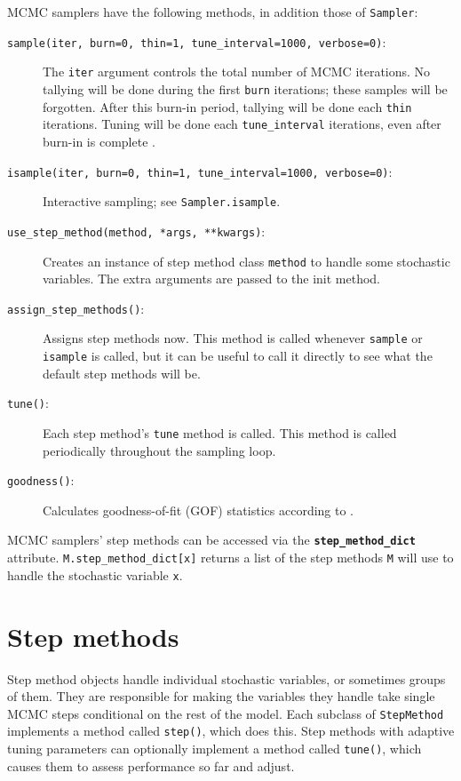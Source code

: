 MCMC samplers have the following methods, in addition those of \texttt{Sampler}:
\begin{description}
    \item[\texttt{sample(iter, burn=0, thin=1, tune\_interval=1000, verbose=0)}:] The \texttt{iter} argument controls the total number of MCMC iterations. No tallying will be done during the first \texttt{burn} iterations; these samples will be forgotten. After this burn-in period, tallying will be done each \texttt{thin} iterations. Tuning will be done each \texttt{tune\_interval} iterations, even after burn-in is complete \cite{Haario:2001lr}.
    \item[\texttt{isample(iter, burn=0, thin=1, tune\_interval=1000, verbose=0)}:] Interactive sampling; see \texttt{Sampler.isample}.
    \item[\texttt{use_step_method(method, *args, **kwargs)}:] Creates an instance of step method class \texttt{method} to handle some stochastic variables. The extra arguments are passed to the init method.
    \item[\texttt{assign_step_methods()}:] Assigns step methods now. This method is called whenever \texttt{sample} or \texttt{isample} is called, but it can be useful to call it directly to see what the default step methods will be.
    \item[\texttt{tune()}:] Each step method's \texttt{tune} method is called. This method is called periodically throughout the sampling loop.
    \item[\texttt{goodness()}:] Calculates goodness-of-fit (GOF) statistics according to \cite{Brooks:2000il}.
\end{description}

MCMC samplers' step methods can be accessed via the \texttt{\textbf{step_method_dict}} attribute. \texttt{M.step_method_dict[x]} returns a list of the step methods \texttt{M} will use to handle the stochastic variable \texttt{x}.

\section{Step methods} 
\label{sec:stepmethod} 

Step method objects handle individual stochastic variables, or sometimes groups of them. They are responsible for making the variables they handle take single MCMC steps conditional on the rest of the model. Each subclass of \texttt{StepMethod} implements a method called \texttt{step()}, which does this. Step methods with adaptive tuning parameters can optionally implement a method called \texttt{tune()}, which causes them to assess performance so far and adjust.

